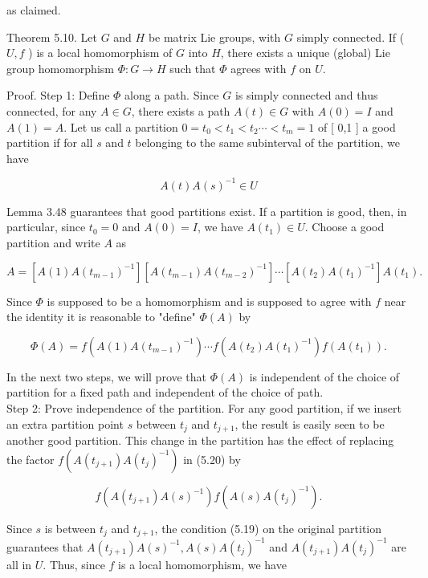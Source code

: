 \documentclass[10pt, letterpaper]{article}
\begin{document}
as claimed.

Theorem 5.10. Let $G$ and $H$ be matrix Lie groups, with $G$ simply connected. If ( $U, f$ ) is a local homomorphism of $G$ into $H$, there exists a unique (global) Lie group homomorphism $\Phi: G \rightarrow H$ such that $\Phi$ agrees with $f$ on $U$.

Proof. Step 1: Define $\Phi$ along a path. Since $G$ is simply connected and thus connected, for any $A \in G$, there exists a path $A(t) \in G$ with $A(0)=I$ and $A(1)=A$. Let us call a partition $0=t_{0}<t_{1}<t_{2} \cdots<t_{m}=1$ of [ 0,1 ] a good partition if for all $s$ and $t$ belonging to the same subinterval of the partition, we have

$$
A(t) A(s)^{-1} \in U
$$

Lemma 3.48 guarantees that good partitions exist. If a partition is good, then, in particular, since $t_{0}=0$ and $A(0)=I$, we have $A\left(t_{1}\right) \in U$. Choose a good partition and write $A$ as

$$
A=\left[A(1) A\left(t_{m-1}\right)^{-1}\right]\left[A\left(t_{m-1}\right) A\left(t_{m-2}\right)^{-1}\right] \cdots\left[A\left(t_{2}\right) A\left(t_{1}\right)^{-1}\right] A\left(t_{1}\right) .
$$

Since $\Phi$ is supposed to be a homomorphism and is supposed to agree with $f$ near the identity it is reasonable to "define" $\Phi(A)$ by

$$
\Phi(A)=f\left(A(1) A\left(t_{m-1}\right)^{-1}\right) \cdots f\left(A\left(t_{2}\right) A\left(t_{1}\right)^{-1}\right) f\left(A\left(t_{1}\right)\right) .
$$

In the next two steps, we will prove that $\Phi(A)$ is independent of the choice of partition for a fixed path and independent of the choice of path.\\
Step 2: Prove independence of the partition. For any good partition, if we insert an extra partition point $s$ between $t_{j}$ and $t_{j+1}$, the result is easily seen to be another good partition. This change in the partition has the effect of replacing the factor $f\left(A\left(t_{j+1}\right) A\left(t_{j}\right)^{-1}\right)$ in (5.20) by

$$
f\left(A\left(t_{j+1}\right) A(s)^{-1}\right) f\left(A(s) A\left(t_{j}\right)^{-1}\right) .
$$

Since $s$ is between $t_{j}$ and $t_{j+1}$, the condition (5.19) on the original partition guarantees that $A\left(t_{j+1}\right) A(s)^{-1}, A(s) A\left(t_{j}\right)^{-1}$ and $A\left(t_{j+1}\right) A\left(t_{j}\right)^{-1}$ are all in $U$. Thus, since $f$ is a local homomorphism, we have
\end{document}
